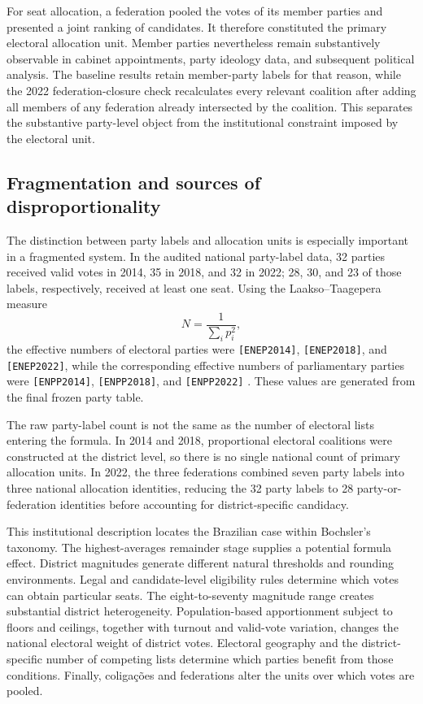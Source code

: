 \documentclass[11pt]{article}
\begin{document}
For seat allocation, a federation pooled the votes of its member parties and
presented a joint ranking of candidates. It therefore constituted the primary
electoral allocation unit. Member parties nevertheless remain substantively
observable in cabinet appointments, party ideology data, and subsequent
political analysis. The baseline results retain member-party labels for that
reason, while the 2022 federation-closure check recalculates every relevant
coalition after adding all members of any federation already intersected by
the coalition. This separates the substantive party-level object from the
institutional constraint imposed by the electoral unit.

\subsection{Fragmentation and sources of disproportionality}

The distinction between party labels and allocation units is especially
important in a fragmented system. In the audited national party-label data,
32 parties received valid votes in 2014, 35 in 2018, and 32 in 2022; 28, 30,
and 23 of those labels, respectively, received at least one seat. Using the
Laakso--Taagepera measure
\[
N=\frac{1}{\sum_i p_i^2},
\]
the effective numbers of electoral parties were
\texttt{[ENEP2014]}, \texttt{[ENEP2018]}, and
\texttt{[ENEP2022]}, while the corresponding effective numbers of
parliamentary parties were
\texttt{[ENPP2014]}, \texttt{[ENPP2018]}, and
\texttt{[ENPP2022]}
\parencite{laakso1979effective}.
These values are generated from the final frozen party table.

The raw party-label count is not the same as the number of electoral lists
entering the formula. In 2014 and 2018, proportional electoral coalitions
were constructed at the district level, so there is no single national count
of primary allocation units. In 2022, the three federations combined seven
party labels into three national allocation identities, reducing the 32 party
labels to 28 party-or-federation identities before accounting for
district-specific candidacy.

This institutional description locates the Brazilian case within Bochsler's
taxonomy. The highest-averages remainder stage supplies a potential
formula effect. District magnitudes generate different natural thresholds and
rounding environments. Legal and candidate-level eligibility rules determine
which votes can obtain particular seats. The eight-to-seventy magnitude
range creates substantial district heterogeneity. Population-based
apportionment subject to floors and ceilings, together with turnout and
valid-vote variation, changes the national electoral weight of district votes.
Electoral geography and the district-specific number of competing lists
determine which parties benefit from those conditions. Finally, coligações
and federations alter the units over which votes are pooled.
\end{document}
